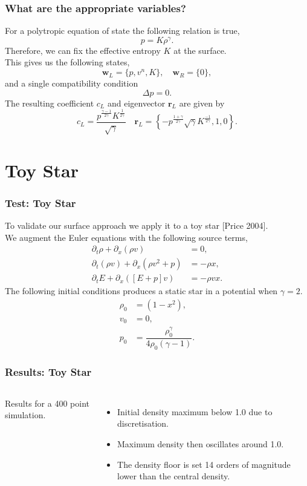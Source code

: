 \documentclass{beamer}
\begin{document}
\begin{frame}
\frametitle{What are the appropriate variables?}
For a polytropic equation of state the following relation is true, 
\begin{equation}
p = K \rho^{\gamma}.
\end{equation}
Therefore, we can fix the effective entropy $K$ at the surface. \\
This gives us the following states,
\begin{equation}
\mathbf{w}_L = \{p,v^n,K\}, \quad \mathbf{w}_R = \{0\},
\end{equation}
and a single compatibility condition
\begin{equation}
\Delta p = 0.
\end{equation}
The resulting coefficient $c_L$ and eigenvector $\mathbf{r}_L$ are given by
\begin{equation}
c_L = \dfrac{p^{\frac{\gamma - 1}{2\gamma}}K^{\frac{1}{2\gamma}}}{\sqrt{\gamma}} \quad \mathbf{r}_L = \left\{-p^{\frac{1+\gamma}{2\gamma}}\sqrt{\gamma}K^{\frac{-1}{2\gamma}},1,0\right\}.
\end{equation}
\end{frame}

\section{Toy Star}
\begin{frame}
\frametitle{Test: Toy Star}
To validate our surface approach we apply it to a toy star [Price 2004].\\
We augment the Euler equations with the following source terms,
\begin{align}
\partial_t \rho + \partial_x (\rho v) &= 0,\\
\partial_t (\rho v) + \partial_x(\rho v^2 + p) &= -\rho x, \\
\partial_t E + \partial_x([E+p]v) &= -\rho v x.
\end{align}
The following initial conditions produces a static star in a potential when $\gamma = 2$.
\begin{align}
\rho_0 &= (1-x^2),\\
v_0 &= 0, \\
p_0   &= \dfrac{\rho_0^\gamma }{4\rho_0(\gamma-1)}.
\end{align}
\end{frame}

\begin{frame}
\frametitle{Results: Toy Star}
\begin{columns}
\column{7.5cm}
\centering
\column{4.5cm}
Results for a 400 point simulation. 
\begin{itemize}
\item{Initial density maximum below 1.0 due to discretisation.}
\item{Maximum density then oscillates around 1.0.}
\item{The density floor is set 14 orders of magnitude lower than the central density.}
\end{itemize}
\end{columns}
\end{frame}
\end{document}
